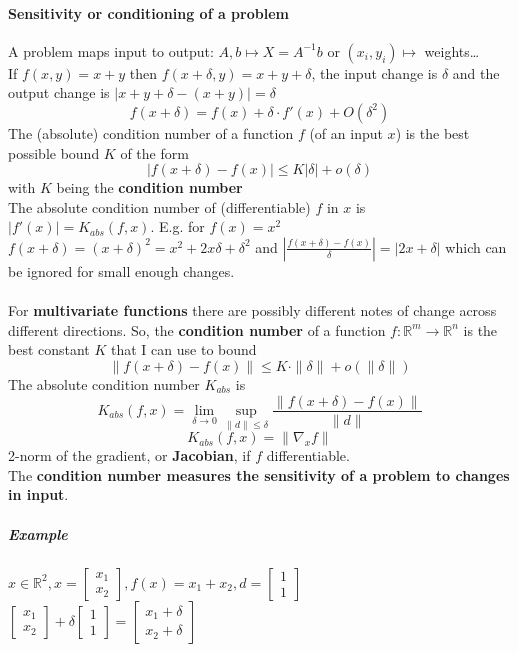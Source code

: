 \documentclass[10pt]{report}
\begin{document}
\paragraph{Sensitivity or conditioning of a problem} A problem maps input to output: $A,b\mapsto X=A^{-1}b$ or $(x_i,y_i)\mapsto$ weights\ldots\\
If $f(x,y) = x+y$ then $f(x+\delta, y) = x+y+\delta$, the input change is $\delta$ and the output change is $|x+y+\delta - (x+y)| = \delta$
$$f(x+\delta) = f(x)+\delta\cdot f'(x) + O(\delta^2)$$
The (absolute) condition number of a function $f$ (of an input $x$) is the best possible bound $K$ of the form
$$|f(x+\delta)-f(x)|\leq K|\delta| + o(\delta)$$ with $K$ being the \textbf{condition number}\\
The absolute condition number of (differentiable) $f$ in $x$ is $|f'(x)| = K_{abs}(f,x)$. E.g. for $f(x)=x^2$\\$f(x+\delta)=(x+\delta)^2 = x^2+2x\delta+\delta^2$ and $|\frac{f(x+\delta)-f(x)}{\delta}|=|2x+\delta|$ which can be ignored for small enough changes.\\\\
For \textbf{multivariate functions} there are possibly different notes of change across different directions. So, the \textbf{condition number} of a function $f:\mathbb{R}^m\rightarrow \mathbb{R}^n$ is the best constant $K$ that I can use to bound $$\|f(x+\delta)-f(x)\| \leq K\cdot\|\delta\| + o(\|\delta\|)$$
The absolute condition number $K_{abs}$ is $$K_{abs}(f,x) = \lim_{\delta\to 0} \sup_{\|d\|\leq \delta}\frac{\|f(x+\delta)-f(x)\|}{\|d\|}$$ $$K_{abs}(f,x) = \|\nabla_x f\|$$ 2-norm of the gradient, or \textbf{Jacobian}, if $f$ differentiable.\\
The \textbf{condition number measures the sensitivity of a problem to changes in input}.
\subparagraph{Example} $x\in \mathbb{R}^2, x=\left[\begin{array}{c}
x_1\\x_2
\end{array}\right], f(x) = x_1 + x_2, d = \left[\begin{array}{c}
1\\1
\end{array}\right]$\\
$\left[\begin{array}{c}
x_1\\x_2
\end{array}\right] + \delta\left[\begin{array}{c}
1\\1
\end{array}\right] = \left[\begin{array}{c}
x_1+\delta\\x_2+\delta
\end{array}\right]$
\end{document}
